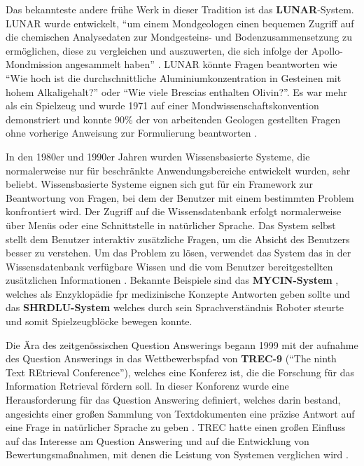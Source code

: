 \documentclass[
        ngerman,
        paper=a4,
        numbers=noendperiod,
]{scrreprt}
\begin{document}
Das bekannteste andere frühe Werk in dieser Tradition ist das \textbf{LUNAR}-System. LUNAR wurde entwickelt, \enquote{um einem Mondgeologen einen bequemen Zugriff auf die chemischen Analysedaten zur Mondgesteins- und Bodenzusammensetzung zu ermöglichen, diese zu vergleichen und auszuwerten, die sich infolge der Apollo-Mondmission angesammelt haben} \citep{4-8ProgressGeology} . LUNAR könnte Fragen beantworten wie \enquote{Wie hoch ist die durchschnittliche Aluminiumkonzentration in Gesteinen mit hohem Alkaligehalt?} oder \enquote{Wie viele Brescias enthalten Olivin?}. Es war mehr als ein Spielzeug und wurde 1971 auf einer Mondwissenschaftskonvention demonstriert und konnte 90\% der von arbeitenden Geologen gestellten Fragen ohne vorherige Anweisung zur Formulierung beantworten \citep[S. 280]{Hirschman2001NaturalHere}. 


In den 1980er und 1990er Jahren wurden Wissensbasierte Systeme, die normalerweise nur für beschränkte Anwendungsbereiche entwickelt wurden, sehr beliebt. Wissensbasierte Systeme  eignen sich gut für ein Framework zur Beantwortung von Fragen, bei dem der Benutzer mit einem bestimmten Problem konfrontiert wird. Der Zugriff auf die Wissensdatenbank erfolgt normalerweise über Menüs oder eine Schnittstelle in natürlicher Sprache. Das System selbst stellt dem Benutzer interaktiv zusätzliche Fragen, um die Absicht des Benutzers besser zu verstehen. Um das Problem zu lösen, verwendet das System das in der Wissensdatenbank verfügbare Wissen und die vom Benutzer bereitgestellten zusätzlichen Informationen \citep [S. 5415]{Kolomiyets2011APerspective}. Bekannte Beispiele sind das \textbf{MYCIN-System} \citep{edward1976shortliffe}, welches als Enzyklopädie fpr medizinische Konzepte Antworten geben sollte und das \textbf{SHRDLU-System} \citep{winograd1971procedures} welches durch sein Sprachverständnis Roboter steurte und somit Spielzeugblöcke bewegen konnte.

Die Ära des zeitgenössischen Question Answerings begann 1999 mit der aufnahme des Question Answerings in das Wettbewerbspfad von \textbf{TREC-9} (\enquote{The ninth Text REtrieval Conference}), welches eine  Konferez ist, die die Forschung für das Information Retrieval fördern soll. In dieser Konforenz wurde eine Herausforderung für das Question Answering definiert, welches darin bestand, angesichts einer großen Sammlung von Textdokumenten eine präzise Antwort auf eine Frage in natürlicher Sprache zu geben \citep{VoorheesReportTREC-9}. TREC hatte einen großen Einfluss auf das Interesse am Question Answering und auf die Entwicklung von Bewertungsmaßnahmen, mit denen die Leistung von Systemen verglichen wird \citep{voorhees2005trec}. 
\end{document}
